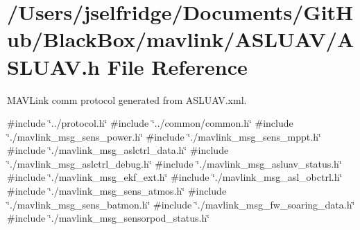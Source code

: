 \section{/\+Users/jselfridge/\+Documents/\+Git\+Hub/\+Black\+Box/mavlink/\+A\+S\+L\+U\+A\+V/\+A\+S\+L\+U\+AV.h File Reference}
\label{_a_s_l_u_a_v_8h}


M\+A\+V\+Link comm protocol generated from A\+S\+L\+U\+A\+V.\+xml.  


{\ttfamily \#include \char`\"{}../protocol.\+h\char`\"{}}\newline
{\ttfamily \#include \char`\"{}../common/common.\+h\char`\"{}}\newline
{\ttfamily \#include \char`\"{}./mavlink\+\_\+msg\+\_\+sens\+\_\+power.\+h\char`\"{}}\newline
{\ttfamily \#include \char`\"{}./mavlink\+\_\+msg\+\_\+sens\+\_\+mppt.\+h\char`\"{}}\newline
{\ttfamily \#include \char`\"{}./mavlink\+\_\+msg\+\_\+aslctrl\+\_\+data.\+h\char`\"{}}\newline
{\ttfamily \#include \char`\"{}./mavlink\+\_\+msg\+\_\+aslctrl\+\_\+debug.\+h\char`\"{}}\newline
{\ttfamily \#include \char`\"{}./mavlink\+\_\+msg\+\_\+asluav\+\_\+status.\+h\char`\"{}}\newline
{\ttfamily \#include \char`\"{}./mavlink\+\_\+msg\+\_\+ekf\+\_\+ext.\+h\char`\"{}}\newline
{\ttfamily \#include \char`\"{}./mavlink\+\_\+msg\+\_\+asl\+\_\+obctrl.\+h\char`\"{}}\newline
{\ttfamily \#include \char`\"{}./mavlink\+\_\+msg\+\_\+sens\+\_\+atmos.\+h\char`\"{}}\newline
{\ttfamily \#include \char`\"{}./mavlink\+\_\+msg\+\_\+sens\+\_\+batmon.\+h\char`\"{}}\newline
{\ttfamily \#include \char`\"{}./mavlink\+\_\+msg\+\_\+fw\+\_\+soaring\+\_\+data.\+h\char`\"{}}\newline
{\ttfamily \#include \char`\"{}./mavlink\+\_\+msg\+\_\+sensorpod\+\_\+status.\+h\char`\"{}}\newline
